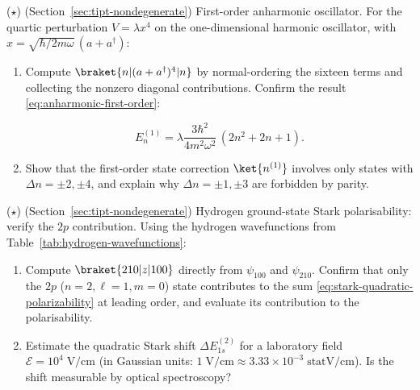 \begin{problemset}

\item ($\star$) (Section~\ref{sec:tipt-nondegenerate}) First-order anharmonic oscillator. For the quartic perturbation $V = \lambda x^{4}$ on the one-dimensional harmonic oscillator, with $x = \sqrt{\hbar/2m\omega}\,(a+a^{\dagger})$:
\begin{enumerate}
\item[(a)] Compute $\braket{n|(a+a^{\dagger})^{4}|n}$ by normal-ordering the sixteen terms and collecting the nonzero diagonal contributions. Confirm the result \eqref{eq:anharmonic-first-order}:
\begin{linenomath}
\begin{equation*}
E_{n}^{(1)} = \lambda\frac{3\hbar^{2}}{4m^{2}\omega^{2}}\,(2n^{2}+2n+1).
\end{equation*}
\end{linenomath}
\item[(b)] Show that the first-order state correction $\ket{n^{(1)}}$ involves only states with $\Delta n = \pm 2, \pm 4$, and explain why $\Delta n = \pm 1, \pm 3$ are forbidden by parity.
\end{enumerate}

\item ($\star$) (Section~\ref{sec:tipt-nondegenerate}) Hydrogen ground-state Stark polarisability: verify the $2p$ contribution. Using the hydrogen wavefunctions from Table~\ref{tab:hydrogen-wavefunctions}:
\begin{enumerate}
\item[(a)] Compute $\braket{210|z|100}$ directly from $\psi_{100}$ and $\psi_{210}$. Confirm that only the $2p$ ($n=2,\ell=1,m=0$) state contributes to the sum \eqref{eq:stark-quadratic-polarizability} at leading order, and evaluate its contribution to the polarisability.
\item[(b)] Estimate the quadratic Stark shift $\Delta E_{1s}^{(2)}$ for a laboratory field $\mathcal{E} = 10^{4}\;\text{V/cm}$ (in Gaussian units: $1\;\text{V/cm} \approx 3.33 \times 10^{-3}\;\text{statV/cm}$). Is the shift measurable by optical spectroscopy?
\end{enumerate}


\end{problemset}
